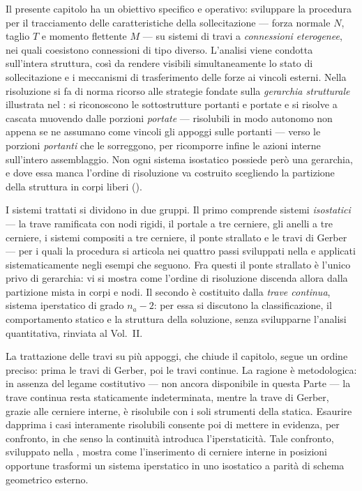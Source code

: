 Il presente capitolo ha un obiettivo specifico e
operativo: sviluppare la procedura per il tracciamento
delle caratteristiche della sollecitazione --- forza
normale $N$, taglio $T$ e momento flettente $M$ ---
su sistemi di travi a \emph{connessioni eterogenee},
nei quali coesistono connessioni di tipo diverso.
L'analisi viene condotta sull'intera struttura,
così da rendere visibili simultaneamente lo stato
di sollecitazione e i meccanismi di trasferimento
delle forze ai vincoli esterni. Nella risoluzione si fa di
norma ricorso alle strategie fondate sulla \emph{gerarchia
strutturale} illustrata nel : si
riconoscono le sottostrutture portanti e portate e si
risolve a cascata muovendo dalle porzioni \emph{portate}
--- risolubili in modo autonomo non appena se ne assumano
come vincoli gli appoggi sulle portanti --- verso le
porzioni \emph{portanti} che le sorreggono, per ricomporre
infine le azioni interne sull'intero assemblaggio. Non ogni
sistema isostatico possiede però una gerarchia, e dove essa
manca l'ordine di risoluzione va costruito scegliendo la
partizione della struttura in corpi liberi
().

I sistemi trattati si dividono in due gruppi. Il primo
comprende sistemi \emph{isostatici} --- la trave ramificata
con nodi rigidi, il portale a tre cerniere, gli anelli a tre
cerniere, i sistemi compositi a tre cerniere, il ponte
strallato e le travi di Gerber --- per i quali la procedura
si articola nei quattro passi sviluppati nella
 e applicati sistematicamente
negli esempi che seguono. Fra questi il ponte strallato è
l'unico privo di gerarchia: vi si mostra come l'ordine di
risoluzione discenda allora dalla partizione mista in corpi
e nodi.
Il secondo è costituito dalla \emph{trave continua}, sistema
iperstatico di grado $n_a - 2$: per essa si discutono la
classificazione, il comportamento statico e la struttura
della soluzione, senza svilupparne l'analisi quantitativa,
rinviata al Vol.~II.

La trattazione delle travi su più appoggi, che chiude il
capitolo, segue un ordine preciso: prima le travi di Gerber,
poi le travi continue.
La ragione è metodologica: in assenza del legame costitutivo
--- non ancora disponibile in questa Parte --- la trave
continua resta staticamente indeterminata, mentre la trave
di Gerber, grazie alle cerniere interne, è risolubile con i
soli strumenti della statica. Esaurire dapprima i casi
interamente risolubili consente poi di mettere in evidenza,
per confronto, in che senso la continuità introduca
l'iperstaticità. Tale confronto, sviluppato nella
, mostra come l'inserimento di
cerniere interne in posizioni opportune trasformi un sistema
iperstatico in uno isostatico a parità di schema geometrico
esterno.



